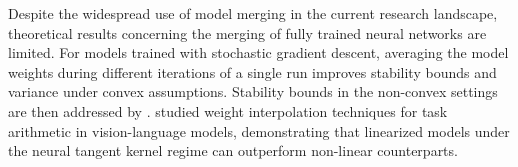 Despite the widespread use of model merging in the current research landscape, theoretical results concerning the merging of fully trained neural networks are limited. For models trained with stochastic gradient descent, averaging the model weights during different iterations of a single run improves stability bounds \citep{hardt2016train} and variance \citep{jain2018parallelizing} under convex assumptions. Stability bounds in the non-convex settings are then addressed by \citet{wang2024generalization}.  \citet{ortiz2023task} studied weight interpolation techniques for task arithmetic in vision-language models, demonstrating that linearized models under the neural tangent kernel regime can outperform non-linear counterparts.





